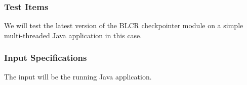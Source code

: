 





\subsubsection{Test Items}
We will test the latest version of the BLCR checkpointer module on a simple multi-threaded Java application in this case.

\subsubsection{Input Specifications}
The input will be the running Java application.

